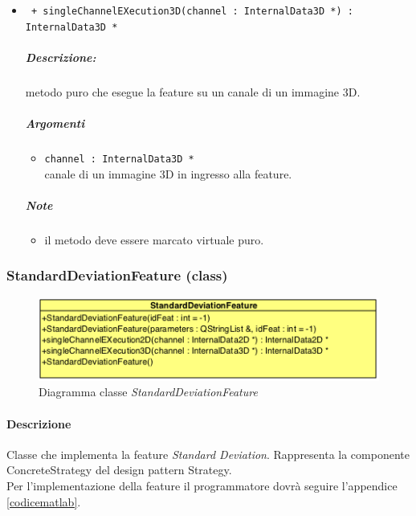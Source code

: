 \begin{itemize}
	\item \color{blue}\verb! + singleChannelEXecution3D(channel : InternalData3D *) : InternalData3D *!
		\color{black}
		\subparagraph{Descrizione:} metodo puro che esegue la feature su un canale di un immagine 3D.
		\subparagraph{Argomenti}
			\begin{itemize}
				\item \color{RoyalPurple} \verb!channel : InternalData3D * ! \\ 
				\color{black} canale di un immagine 3D in ingresso alla feature.		
			\end{itemize}
		\subparagraph{Note}
			\begin{itemize}
				\item il metodo deve essere marcato virtuale puro.
			\end{itemize}
			
	\end{itemize}

\color{black}
\pagebreak
\subsubsection{StandardDeviationFeature (class)}
\label{StandardDeviationFeature}
\begin{figure}[!h]
\centering
			\includegraphics[scale=1]{./Content/Immagini/modelCore/StandardDeviationFeature.png}
			\caption{Diagramma classe \textsl{StandardDeviationFeature}}
			\label{standardDeviationFeature_img}
\end{figure}

\paragraph{Descrizione \\} Classe che implementa la feature\g{} \textit{Standard Deviation}. Rappresenta la componente ConcreteStrategy del design pattern\g{} Strategy.
\\Per l'implementazione della feature\g{} il programmatore dovrà seguire l'appendice \ref{codicematlab}.

